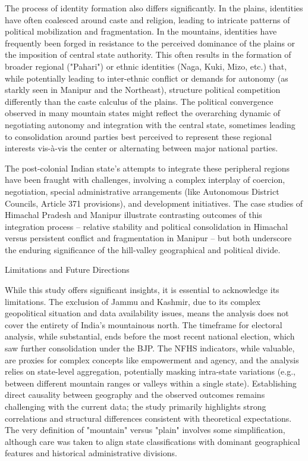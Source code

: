 The process of identity formation also differs significantly. In the plains, identities have often coalesced around caste and religion, leading to intricate patterns of political mobilization and fragmentation. In the mountains, identities have frequently been forged in resistance to the perceived dominance of the plains or the imposition of central state authority. This often results in the formation of broader regional ("Pahari") or ethnic identities (Naga, Kuki, Mizo, etc.) that, while potentially leading to inter-ethnic conflict or demands for autonomy (as starkly seen in Manipur and the Northeast), structure political competition differently than the caste calculus of the plains. The political convergence observed in many mountain states might reflect the overarching dynamic of negotiating autonomy and integration with the central state, sometimes leading to consolidation around parties best perceived to represent these regional interests vis-à-vis the center or alternating between major national parties.

The post-colonial Indian state's attempts to integrate these peripheral regions have been fraught with challenges, involving a complex interplay of coercion, negotiation, special administrative arrangements (like Autonomous District Councils, Article 371 provisions), and development initiatives. The case studies of Himachal Pradesh and Manipur illustrate contrasting outcomes of this integration process – relative stability and political consolidation in Himachal versus persistent conflict and fragmentation in Manipur – but both underscore the enduring significance of the hill-valley geographical and political divide.

Limitations and Future Directions

While this study offers significant insights, it is essential to acknowledge its limitations. The exclusion of Jammu and Kashmir, due to its complex geopolitical situation and data availability issues, means the analysis does not cover the entirety of India's mountainous north. The timeframe for electoral analysis, while substantial, ends before the most recent national election, which saw further consolidation under the BJP. The NFHS indicators, while valuable, are proxies for complex concepts like empowerment and agency, and the analysis relies on state-level aggregation, potentially masking intra-state variations (e.g., between different mountain ranges or valleys within a single state). Establishing direct causality between geography and the observed outcomes remains challenging with the current data; the study primarily highlights strong correlations and structural differences consistent with theoretical expectations. The very definition of "mountain" versus "plain" involves some simplification, although care was taken to align state classifications with dominant geographical features and historical administrative divisions.

